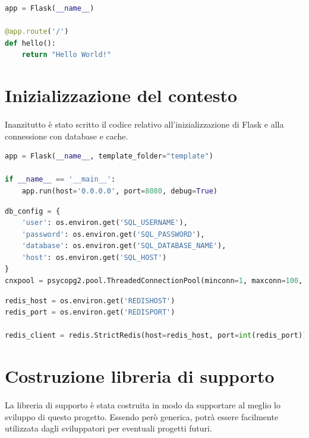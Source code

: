 \documentclass[12pt,a4paper,twoside,english,italian]{book}
\begin{document}
\begin{lstlisting}[language=python, caption=Hello world con Flask]
app = Flask(__name__)

@app.route('/')
def hello():
    return "Hello World!"
\end{lstlisting}

\section{Inizializzazione del contesto}

\paragraph{} Inanzitutto è stato scritto il codice relativo all'inizializzazione di Flask e alla connessione con database e cache.

\begin{lstlisting}[language=python, caption=Inizializzazione del server]
app = Flask(__name__, template_folder="template")

if __name__ == '__main__':
    app.run(host='0.0.0.0', port=8080, debug=True)
\end{lstlisting}

\begin{lstlisting}[language=python, caption=Connessione al database]
db_config = {
    'user': os.environ.get('SQL_USERNAME'),
    'password': os.environ.get('SQL_PASSWORD'),
    'database': os.environ.get('SQL_DATABASE_NAME'),
    'host': os.environ.get('SQL_HOST')
}
cnxpool = psycopg2.pool.ThreadedConnectionPool(minconn=1, maxconn=100, **db_config)
\end{lstlisting}

\begin{lstlisting}[language=python, caption=Connessione alla cache Redis]
redis_host = os.environ.get('REDISHOST')
redis_port = os.environ.get('REDISPORT')

redis_client = redis.StrictRedis(host=redis_host, port=int(redis_port)) if redis_host is not None else None
\end{lstlisting}


\section{Costruzione libreria di supporto}

\paragraph{} La libreria di supporto è stata costruita in modo da supportare al meglio lo sviluppo di questo progetto. Essendo però generica, potrà essere facilmente utilizzata dagli sviluppatori per eventuali progetti futuri.
\end{document}
